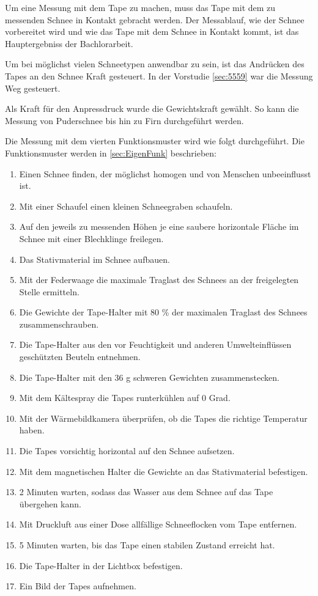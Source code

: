 Um eine Messung mit dem Tape zu machen, muss das Tape mit dem zu messenden Schnee in Kontakt gebracht werden. Der Messablauf, wie der Schnee vorbereitet wird und wie das Tape mit dem Schnee in Kontakt kommt, ist das Hauptergebniss der Bachlorarbeit.

Um bei möglichst vielen Schneetypen anwendbar zu sein, ist das Andrücken des Tapes an den Schnee Kraft gesteuert. In der Vorstudie \ref{sec:5559} war die Messung Weg gesteuert.

Als Kraft für den Anpressdruck wurde die Gewichtskraft gewählt. So kann die Messung von Puderschnee bis hin zu Firn durchgeführt werden.

Die Messung mit dem vierten Funktionsmuster wird wie folgt durchgeführt. Die Funktionsmuster werden in \ref{sec:EigenFunk} beschrieben:

\begin{enumerate}
\item Einen Schnee finden, der möglichst homogen und von Menschen unbeeinflusst ist.
\item Mit einer Schaufel einen kleinen Schneegraben schaufeln.
\item Auf den jeweils zu messenden Höhen je eine saubere horizontale Fläche im Schnee mit einer Blechklinge freilegen.
\item Das Stativmaterial im Schnee aufbauen.
\item Mit der Federwaage die maximale Traglast des Schnees an der freigelegten Stelle ermitteln.
\item Die Gewichte der Tape-Halter mit 80 \% der maximalen Traglast des Schnees zusammenschrauben.
\item Die Tape-Halter aus den vor Feuchtigkeit und anderen Umwelteinflüssen geschützten Beuteln entnehmen.
\item Die Tape-Halter mit den 36 g schweren Gewichten zusammenstecken.
\item Mit dem Kältespray die Tapes runterkühlen auf 0 Grad.
\item Mit der Wärmebildkamera überprüfen, ob die Tapes die richtige Temperatur haben.
\item Die Tapes vorsichtig horizontal auf den Schnee aufsetzen.
\item Mit dem magnetischen Halter die Gewichte an das Stativmaterial befestigen.
\item 2 Minuten warten, sodass das Wasser aus dem Schnee auf das Tape übergehen kann.
\item Mit Druckluft aus einer Dose allfällige Schneeflocken vom Tape entfernen.
\item 5 Minuten warten, bis das Tape einen stabilen Zustand erreicht hat.
\item Die Tape-Halter in der Lichtbox befestigen.
\item Ein Bild der Tapes aufnehmen.
\end{enumerate}
